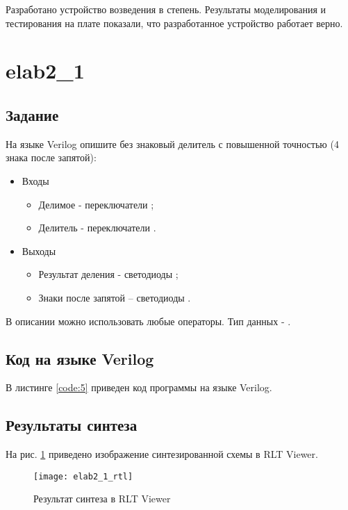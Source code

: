 Разработано устройство возведения в степень. Результаты моделирования и тестирования на плате показали, что разработанное устройство работает верно.

\newpage

\section{elab2\_1}

\subsection{Задание}

На языке Verilog опишите без знаковый делитель с повышенной точностью (4 знака после запятой):
\begin{itemize}
\item Входы
	\begin{itemize}
		\item Делимое - переключатели ;
		\item Делитель - переключатели .
	\end{itemize}
\item Выходы
	\begin{itemize}
		\item Результат деления - светодиоды ;
		\item Знаки после запятой – светодиоды .
	\end{itemize}
\end{itemize}

В описании можно использовать любые операторы. Тип данных - .

\subsection{Код на языке Verilog}

В листинге \ref{code:5} приведен код программы на языке Verilog.



\subsection{Результаты синтеза}

На рис. \ref{fig:elab2_1_rtl} приведено изображение синтезированной схемы в RLT Viewer.

\begin{figure}[H]
\begin{center}
	\texttt{[image: elab2\_1\_rtl]}
	\caption{Результат синтеза в RLT Viewer}
	\label{fig:elab2_1_rtl}
\end{center}
\end{figure}

